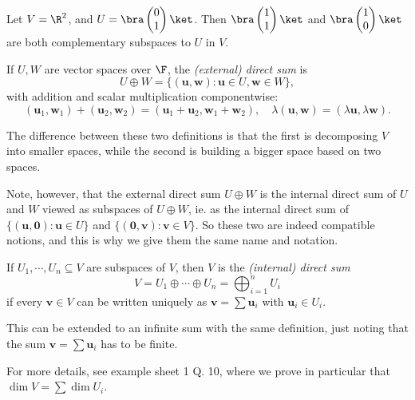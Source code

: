 \documentclass[a4paper]{article}
\begin{document}
\begin{eg}
  Let $V = \R^2$, and $U = \bra \begin{pmatrix}0\\1\end{pmatrix}\ket$. Then $\bra \begin{pmatrix}1\\1\end{pmatrix}\ket$ and $\bra \begin{pmatrix}1\\0\end{pmatrix}\ket$ are both complementary subspaces to $U$ in $V$.
\end{eg}

\begin{defi}
  If $U, W$ are vector spaces over $\F$, the \emph{(external) direct sum} is
  \[
    U\oplus W = \{(\mathbf{u}, \mathbf{w}): \mathbf{u}\in U, \mathbf{w}\in W\},
  \]
  with addition and scalar multiplication componentwise:
  \[
    (\mathbf{u}_1, \mathbf{w}_1) + (\mathbf{u}_2, \mathbf{w}_2) = (\mathbf{u}_1 + \mathbf{u}_2, \mathbf{w}_1 + \mathbf{w}_2),\quad \lambda (\mathbf{u}, \mathbf{w}) = (\lambda \mathbf{u}, \lambda \mathbf{w}).
  \]
\end{defi}
The difference between these two definitions is that the first is decomposing $V$ into smaller spaces, while the second is building a bigger space based on two spaces.

Note, however, that the external direct sum $U\oplus W$ is the internal direct sum of $U$ and $W$ viewed as subspaces of $U\oplus W$, ie. as the internal direct sum of $\{(\mathbf{u}, \mathbf{0}): \mathbf{u}\in U\}$ and $\{(\mathbf{0}, \mathbf{v}): \mathbf{v}\in V\}$. So these two are indeed compatible notions, and this is why we give them the same name and notation.

\begin{defi}
  If $U_1, \cdots, U_n\subseteq V$ are subspaces of $V$, then $V$ is the \emph{(internal) direct sum}
  \[
    V = U_1 \oplus \cdots \oplus U_n = \bigoplus_{i = 1}^n U_i
  \]
  if every $\mathbf{v}\in V$ can be written uniquely as $\mathbf{v} = \sum \mathbf{u}_i$ with $\mathbf{u}_i \in U_i$.

  This can be extended to an infinite sum with the same definition, just noting that the sum $\mathbf{v} = \sum \mathbf{u}_i$ has to be finite.
\end{defi}
For more details, see example sheet 1 Q. 10, where we prove in particular that $\dim V = \sum \dim U_i$.
\end{document}
